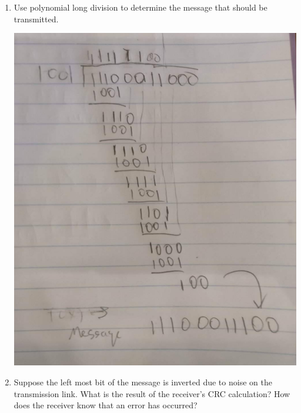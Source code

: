 \documentclass[11pt]{article}
\begin{document}
\begin{enumerate}
    \item Use polynomial long division to determine the message that should be transmitted.
    \begin{center}
        \includegraphics[scale=0.4]{2_18_1}        
    \end{center}
    \item Suppose the left most bit of the message is inverted due to noise on the transmission link. What is the result of the receiver’s CRC calculation? How does the receiver know that an error has occurred?
    \begin{center}

\end{center}
\end{enumerate}
\end{document}

